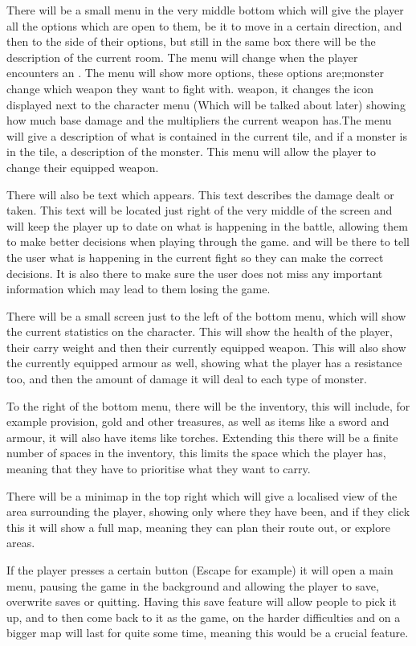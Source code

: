 \documentclass[14pt]{article}
\begin{document}
There will be a small menu in the very middle bottom which will give the player all the options which are open to them, be it to move in a certain direction, and then to the side of their options, but still in the same box there will be the description of the current room. The menu will change when the player encounters an . The menu will show more options, these options are;monster change which weapon they want to fight with. weapon, it changes the icon displayed next to the character menu (Which will be talked about later) showing how much base damage and the multipliers the current weapon has.The menu will give a description of what is contained in the current tile, and if a monster is in the tile, a description of the monster. This menu will allow the player to change their equipped weapon. 

There will also be text which appears. This text describes the damage dealt or taken. This text will be located just right of the very middle of the screen and will keep the player up to date on what is happening in the battle, allowing them to make better decisions when playing through the game. and will be there to tell the user what is happening in the current fight so they can make the correct decisions. It is also there to make sure the user does not miss any important information which may lead to them losing the game. 

There will be a small screen just to the left of the bottom menu, which will show the current statistics on the character. This will show the health of the player, their carry weight and then their currently equipped weapon. This will also show the currently equipped armour as well, showing what the player has a resistance too, and then the amount of damage it will deal to each type of monster.  

To the right of the bottom menu, there will be the inventory, this will include, for example provision, gold and other treasures, as well as items like a sword and armour, it will also have items like torches. Extending this there will be a finite number of spaces in the inventory, this limits the space which the player has, meaning that they have to prioritise what they want to carry.

There will be a minimap in the top right which will give a localised view of the area surrounding the player, showing only where they have been, and if they click this it will show a full map, meaning they can plan their route out, or explore areas. 

If the player presses a certain button (Escape for example) it will open a main menu, pausing the game in the background and allowing the player to save, overwrite saves or quitting. Having this save feature will allow people to pick it up, and to then come back to it as the game, on the harder difficulties and on a bigger map will last for quite some time, meaning this would be a crucial feature.
\end{document}
